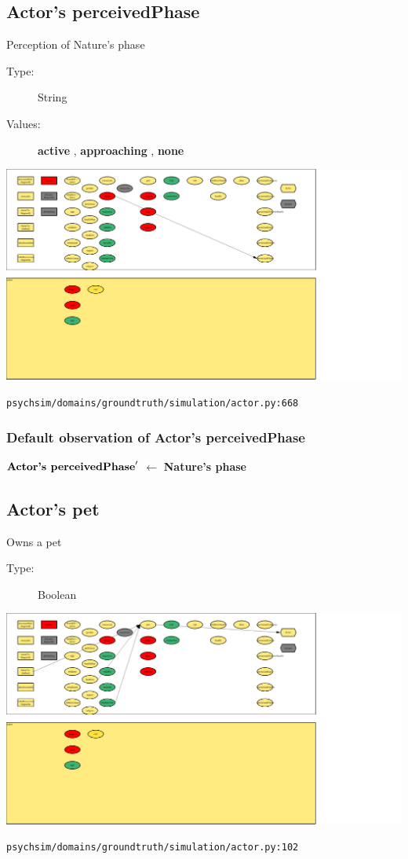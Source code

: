 \documentclass{article}%
\begin{document}
\subsection{Actor's perceivedPhase}%
\label{subsec:Actor's perceivedPhase}%
Perception of Nature's phase%
\begin{description}%
\item[Type:]%
String%
\item[Values:]%
\textbf{active}%
, %
\textbf{approaching}%
, %
\textbf{none}%
\end{description}%
\includegraphics[width=\textwidth]{images/perceivedPhaseOfActor.png}%
\begin{flushleft}%
\verb|psychsim/domains/groundtruth/simulation/actor.py:668|%
\end{flushleft}%
\subsubsection{Default observation of Actor's perceivedPhase}%
\label{ssubsec:Default observation of Actor's perceivedPhase}%
\begin{flushleft}%
$\mbox{\textbf{Actor's perceivedPhase}} '$%
$\leftarrow$%
\textbf{Nature's phase}%
\end{flushleft}

%
\subsection{Actor's pet}%
\label{subsec:Actor's pet}%
Owns a pet%
\begin{description}%
\item[Type:]%
Boolean%
\end{description}%
\includegraphics[width=\textwidth]{images/petOfActor.png}%
\begin{flushleft}%
\verb|psychsim/domains/groundtruth/simulation/actor.py:102|%
\end{flushleft}%
\end{document}

